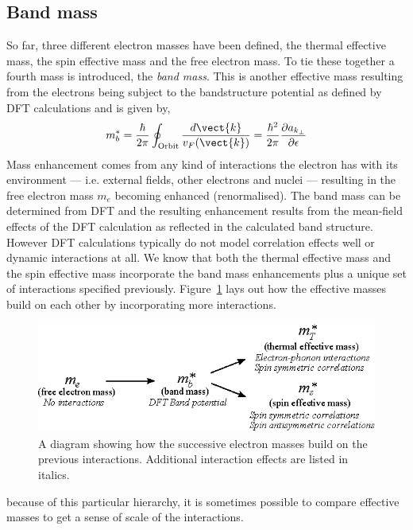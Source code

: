 \subsection{Band mass}

So far, three different electron masses have been defined, the thermal effective mass, the spin effective mass and the free electron mass. To tie these together a fourth mass is introduced, the \emph{band mass}. This is another effective mass resulting from the electrons being subject to the bandstructure potential as defined by \ac{DFT} calculations and is given by,
\begin{equation}
    \label{Eqn:Theo:BandMass}
  m^*_b = \frac{\hbar}{2\pi} \oint_{\textrm{Orbit}} \frac{d\vect{k}}{v_F(\vect{k})} = \frac{\hbar^2}{2\pi}\frac{\partial a_{k_\perp}}{\partial \epsilon}
\end{equation}
Mass enhancement comes from any kind of interactions the electron has with its environment --- i.e. external fields, other electrons and nuclei --- resulting in the free electron mass $m_e$ becoming enhanced (renormalised). The band mass can be determined from \ac{DFT} and the resulting enhancement results from the mean-field effects of the \ac{DFT} calculation as reflected in the calculated band structure. However \ac{DFT} calculations typically do not model correlation effects well or dynamic interactions at all. We know that both the thermal effective mass and the spin effective mass incorporate the band mass enhancements plus a unique set of interactions specified previously. Figure~\ref{Fig:Theo:EffectiveMassInheritance} lays out how the effective masses build on each other by incorporating more interactions.
\begin{figure}[htbp]
    \begin{center}
        \includegraphics[scale=0.9]{Chapter-Theory/Figures/EffectiveMassInheritance/EffectiveMassInheritance}
        \caption{A diagram showing how the successive electron masses build on the previous interactions. Additional interaction effects are listed in italics.}
        \label{Fig:Theo:EffectiveMassInheritance}
    \end{center}
\end{figure}
because of this particular hierarchy, it is sometimes possible to compare effective masses to get a sense of scale of the interactions.

